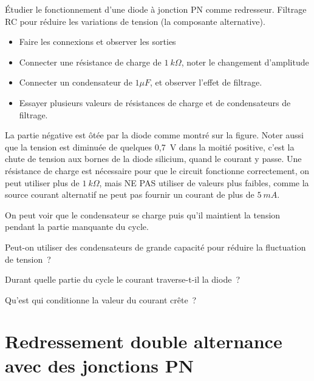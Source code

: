 \documentclass[a4paper,12pt,french]{sphinxmanual}
\let\sphinxpxdimen\pdfpxdimen\else\newdimen\sphinxpxdimen
\begin{document}
Étudier le fonctionnement d’une diode à jonction PN comme redresseur.
Filtrage RC pour réduire les variations de tension (la composante
alternative).

\noindent\sphinxincludegraphics[width=300\sphinxpxdimen]{{halfwave}.pdf}
\noindent\sphinxincludegraphics[width=300\sphinxpxdimen]{{halfwave}.pdf}

\begin{itemize}
\item {} 
Faire les connexions et observer les sorties

\item {} 
Connecter une résistance de charge de \(1~k\Omega\), noter le changement
d’amplitude

\item {} 
Connecter un condensateur de \(1 \mu F\),  et observer l’effet de filtrage.

\item {} 
Essayer plusieurs valeurs de résistances de charge et de
condensateurs de filtrage.

\end{itemize}


La partie négative est ôtée par la diode comme montré sur la figure.
Noter aussi que la tension est diminuée de quelques 0,7 V dans la moitié
positive, c’est la chute de tension aux bornes de la diode silicium,
quand le courant y passe. Une résistance de charge est nécessaire pour
que le circuit fonctionne correctement, on peut utiliser plus de
\(1~k\Omega\), mais NE PAS utiliser de valeurs plus faibles, comme la source
courant alternatif ne peut pas fournir un courant de plus de \(5~mA\).

On peut voir que le condensateur se charge puis qu’il maintient la
tension pendant la partie manquante du cycle.

Peut-on utiliser des condensateurs de grande capacité pour réduire la
fluctuation de tension ?

Durant quelle partie du cycle le courant traverse-t-il la diode ?

Qu’est qui conditionne la valeur du courant crête ?


\section{Redressement double alternance avec des jonctions PN}
\label{\detokenize{3.2:redressement-double-alternance-avec-des-jonctions-pn}}\label{\detokenize{3.2::doc}}
\end{document}
